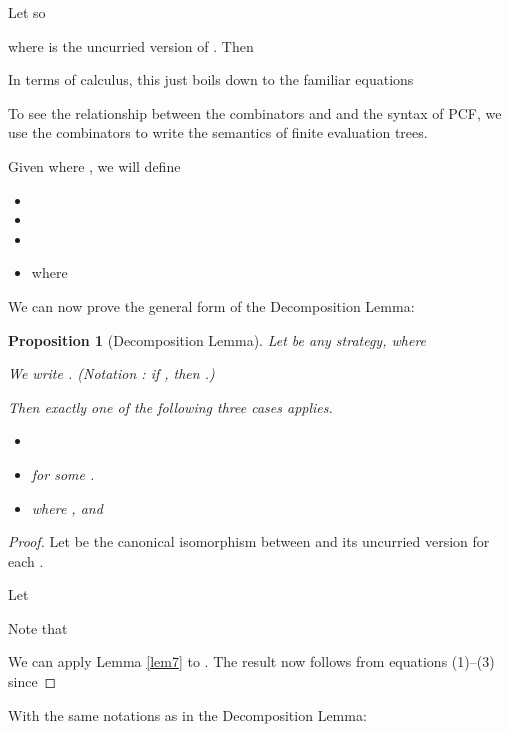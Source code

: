 \documentclass[11pt]{article}
\newtheorem{proposition}[theorem]{Proposition}
\begin{document}
Let  so

where  is the
uncurried version of .
Then

In terms of calculus, this just boils down to the familiar
equations


To see the relationship between the combinators  and
 and
the syntax of PCF, we use the combinators to write the semantics of
finite evaluation trees.

\newcommand{\sem}[1]{{\cal S}( #1)}
Given  where , we
will define


\begin{itemize}
\item 
\item 
\item 
\item 
where



\end{itemize}
We can now prove the general form of the Decomposition Lemma:
\begin{proposition}[Decomposition Lemma]\label{lem8}
Let  be any
strategy, where

We write .
(Notation : if , then
.)

Then exactly one of the following three cases applies.
\begin{itemize}
\item[(i)] 
\item[(ii)] 
  for some .
\item[(iii)]
   where , and

\end{itemize}

\end{proposition}
\begin{proof} Let  be the
canonical isomorphism between  and its uncurried version
 for each
.

Let

Note that


We can apply Lemma \ref{lem7} to
. The result now follows from
equations (1)--(3) since 
\end{proof}

With the same notations as in the Decomposition Lemma:
\end{document}

